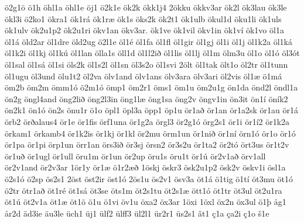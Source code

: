 {ö2g1ö
ö1h
öhl1a
öhl1e
öj1
ö2k1e
ök2k
ökk1j4
2ökku
ökkv3ar
ök2l
ök3lau
ök3le
ökl3i
ö2ko1
ökra1
ök1rá
ök1ræ
ök1s
öks2k
ök2t1
ök1ulb
ökul1d
öku1li
ök1uls
ök1ulv
ök2u1p2
ök2u1ri
ökv1an
ökv3ar.
ök1ve
ök1vil
ökv1in
ök1ví
ök1vo
öl1a
öl1á
öld2ar
öl1dre
öld2ug
ö2l1e
öl1é
öl1fa
öl1fl
öl1gir
öl1gj
öl1i
öl1j
öl1k2a
öl1ká
öl1k2i
öl1kj
öl1kú
öl1lan
ölla1s
öll1d
öl1l2ið
öl1lis
öl1lj
öl1m
ölm3u
öl1o
öl1ó
öl3ót
öl1sal
öl1sá
öl1si
öls2k
öl1s2l
öl1sn
öl3s2o
öl1svi
2ölt
öl1tak
ölt1o
öl2tr
öl1tunn
öl1ugu
öl3und
ölu1t2
öl2va
ölv1and
ölv1ans
ölv3ara
ölv3ari
öl2vis
öl1æ
ö1má
öm2b
öm2m
ömm1ó
ö2m1ó
ömp1
öm2r1
öms1
öm1u
öm2u1g
ön1da
önd2l
öndl1a
ön2g
öngl4and
öng2lið
öng2l3in
öng1læ
öng1sa
öng2v
öngv1in
ön3it
ön1í
öník2
ön2k1
ön1ó
ön2s
önu1r
ö1o
öpl1
öpl3a
öpp1
öp1u
ör1að
ör1an
ör1a2sk
ör1au
ör1á
örb2
örðalaus4
ör1e
ör1fis
örf1una
ör1g2a
örgl3
ör2g1ó
örg2s1
ör1i
ör1í2
ör1k2a
örkam1
örkamb4
ör1k2is
ör1kj
ör1kl
ör2mu
örm1un
ör1nið
ör1ní
örn1ó
ör1o
ör1ó
ör1pa
ör1pi
örp1un
örr1an
örs3ið
ör3sj
örsn2
ör3s2u
ör1ta2
ör2tó
ört3us
ör1t2v
ör1uð
ör1ugl
ör1ull
öru1m
ör1un
ör2up
öru1s
öru1t
ör1ú
ör2v1að
örv1all
ör2v1and
ör2v3ar
1ör1y
ör1æ
ö1r2æð
1öskj
öskr3
ösk2u1p2
ösk2v
öskv1i
ösl1a
ö2s1ó
ö2sp
ös2s1
2öst
öst2ir
öst1ó
2ös1u
ös2v1
ösv3a
öt1á
ö1tig
ö1tí
öt3mu
öt1ó
ö2tr
ötr1að
öt1ré
öt1sá
öt3se
öts1m
öt2s1tu
öt2s1æ
ött1ó
öt1tr
öt3ul
öt2u1ra
öt1ú
öt2v1a
öt1æ
öt1ö
ö1u
ö1vi
öv1u
öxa2
öx3ar
1öxi
1öxl
öx2n
öx3ul
ö1þ
åg1
år2d
äd3ie
äu3le
üch1
üj1
ülf2
ülff3
ül2l1
ür2r1
üs2s1
ât1
ç1a
ça2i
ç1o
š1e

}
